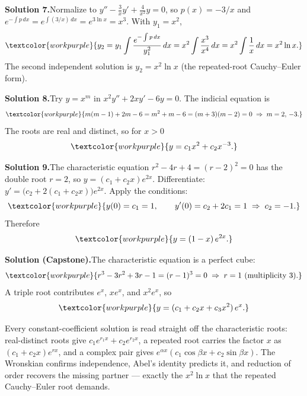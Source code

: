 \medskip
\noindent\textbf{Solution 7.}\quad Normalize to $y'' - \tfrac{3}{x}y' + \tfrac{4}{x^2}y = 0$,
so $p(x) = -3/x$ and $e^{-\int p\,dx} = e^{\int (3/x)\,dx} = e^{3\ln x} = x^3$. With
$y_1=x^2$,
\[ \textcolor{workpurple}{y_2 = y_1\int \frac{e^{-\int p\,dx}}{y_1^2}\,dx
   = x^2\int \frac{x^3}{x^4}\,dx = x^2\int \frac{1}{x}\,dx = x^2\ln x.} \]
The second independent solution is $y_2 = x^2\ln x$ (the repeated-root
Cauchy--Euler form).

\medskip
\noindent\textbf{Solution 8.}\quad Try $y=x^m$ in $x^2y''+2xy'-6y=0$. The indicial
equation is
\[ \textcolor{workpurple}{m(m-1) + 2m - 6 = m^2 + m - 6 = (m+3)(m-2) = 0 \;\Rightarrow\; m = 2,\,-3.} \]
The roots are real and distinct, so for $x>0$
\[ \textcolor{workpurple}{y = c_1 x^2 + c_2 x^{-3}.} \]

\medskip
\noindent\textbf{Solution 9.}\quad The characteristic equation
$r^2 - 4r + 4 = (r-2)^2 = 0$ has the double root $r=2$, so
$y = (c_1 + c_2 x)e^{2x}$. Differentiate:
$y' = \big(c_2 + 2(c_1 + c_2 x)\big)e^{2x}$. Apply the conditions:
\[ \textcolor{workpurple}{y(0) = c_1 = 1, \qquad y'(0) = c_2 + 2c_1 = 1 \;\Rightarrow\; c_2 = -1.} \]
Therefore
\[ \textcolor{workpurple}{y = (1 - x)\,e^{2x}.} \]

\medskip
\noindent\textbf{Solution (Capstone).}\quad The characteristic equation is a
perfect cube:
\[ \textcolor{workpurple}{r^3 - 3r^2 + 3r - 1 = (r-1)^3 = 0 \;\Rightarrow\; r = 1 \text{ (multiplicity 3)}.} \]
A triple root contributes $e^{x}$, $x e^{x}$, and $x^2 e^{x}$, so
\[ \textcolor{workpurple}{y = (c_1 + c_2 x + c_3 x^2)\,e^{x}.} \]

\vspace{0.8em}
\begin{conceptbox}
Every constant-coefficient solution is read straight off the
\textcolor{accentorange}{characteristic roots}: real-distinct roots give
\textcolor{accentorange}{$c_1 e^{r_1 x} + c_2 e^{r_2 x}$}, a repeated root carries
the factor $x$ as \textcolor{accentorange}{$(c_1 + c_2 x)e^{rx}$}, and a complex
pair gives \textcolor{accentorange}{$e^{\alpha x}(c_1\cos\beta x + c_2\sin\beta x)$}.
The \textcolor{accentorange}{Wronskian} confirms independence,
\textcolor{accentorange}{Abel's identity} predicts it, and
\textcolor{accentorange}{reduction of order} recovers the missing partner ---
exactly the $x^2\ln x$ that the repeated Cauchy--Euler root demands.
\end{conceptbox}


